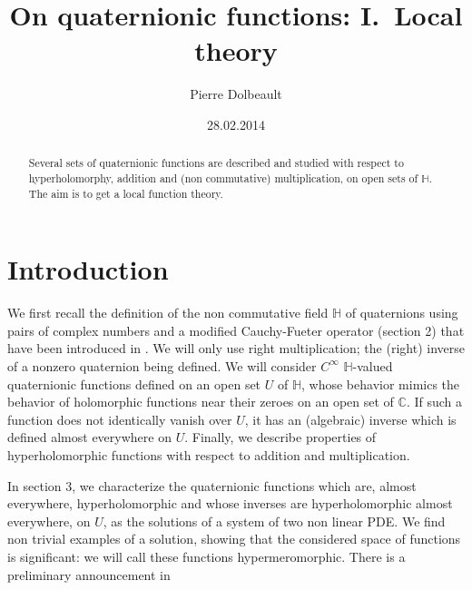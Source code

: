 \documentclass[12pt]{amsart}
\theoremstyle{definition}
\begin{document}
\baselineskip=17pt

\title[On quaternionic functions: I.] 
{On quaternionic functions: I.\ Local theory}

\author[P. Dolbeault]{Pierre Dolbeault}
\address{Institut de Math\'ematiques de Jussieu\\
UPMC, 4, place Jussieu 75005 Paris, France}

\date{28.02.2014}

\begin{abstract}
Several sets of quaternionic functions are 
described and studied with respect to hyperholomorphy, addition and (non commutative) multiplication, on open sets of ${\mathbb H}$. The aim is to get a local function theory.
\end{abstract}



\maketitle
\thispagestyle{empty}
{\small\tableofcontents}

\section{Introduction}
We first recall the definition of the non commutative field ${\mathbb H}$ of quaternions using pairs of complex numbers and a modified Cauchy-Fueter operator (section 2) that have been introduced in \cite{CLSSS 07}. 
We will only use right multiplication; the (right) inverse of a nonzero quaternion being defined. We will consider $C^\infty$ ${\mathbb H}$-valued quaternionic functions defined on an open set $U$ of ${\mathbb H}$, whose behavior mimics the behavior of holomorphic functions near their zeroes on an open set of ${\mathbb{C}}$. If such a function does not identically vanish over $U$, it has an (algebraic) inverse which is defined almost everywhere on $U$. Finally, we describe properties of hyperholomorphic functions with respect to addition and multiplication. 

In section 3, we characterize the quaternionic functions which are, almost everywhere, hyperholomorphic and whose inverses are hyperholomorphic almost everywhere, on $U$, as the solutions of a system of two non linear PDE. We find non trivial examples of a solution, showing that the considered space of functions is significant: we will call these functions hypermeromorphic. 
There is a preliminary announcement in \cite{D13}
\end{document}
